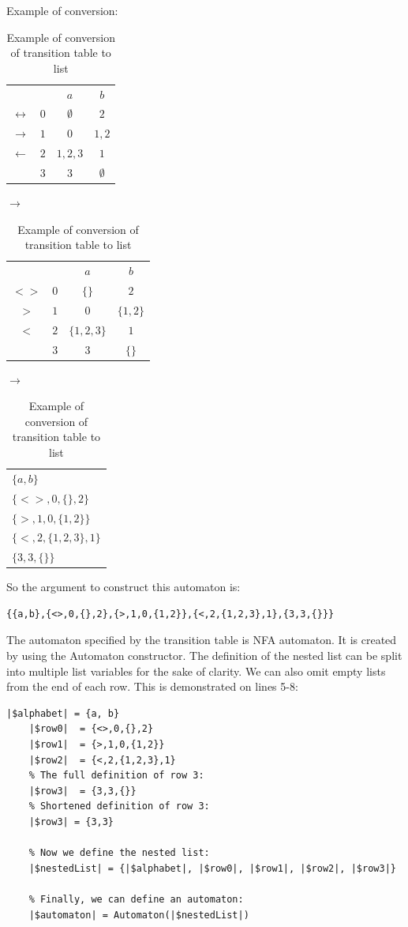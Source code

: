 \documentclass{ctuthesis}
\begin{document}
Example of conversion:
\begin{table}[H]
\begin{ctucolortab}
\begin{tabular}{cc|cc}
	&	& $a$	& $b$ \\\Midrule
$\leftrightarrow$	& $0$	& $\emptyset$	& $2$ \\
$\rightarrow$	& $1$ & $0$ & $1,2$ \\
$\leftarrow$	& $2$ & $1,2,3$ & $1$ \\
				& $3$ & $3$	& $\emptyset$ 
\end{tabular}
\quad
$\rightarrow$
\begin{tabular}{|c|c|c|c|}
\hline
	&&$a$&$b$ \\
	$<>$ & $0$ & $\{\}$ & $2$ \\
	$>$ & $1$ & $0$ & $\{1,2\}$ \\
	$<$ & $2$ & $\{1,2,3\}$ & $1$ \\
		& $3$ & $3$ & $\{\}$\\
		\hline
\end{tabular}
\quad 
$\rightarrow$
\begin{tabular}{|l|}
\hline 
$\{a, b\}$ \\
$\{<>,0,\{\}, 2\}$ \\
$\{>,1,0,\{1,2\}\}$ \\
$\{<,2,\{1,2,3\},1\}$ \\
$\{3, 3, \{\}\}$ \\\hline
\end{tabular}
\end{ctucolortab}
\caption{Example of conversion of transition table to list}
\label{fig:example_conversion}
\end{table}

So the argument to construct this automaton is:
\begin{lstlisting}[language = JASL_snippet]
	{{a,b},{<>,0,{},2},{>,1,0,{1,2}},{<,2,{1,2,3},1},{3,3,{}}}
\end{lstlisting}

The automaton specified by the transition table is NFA automaton. It is created by using the Automaton constructor. The definition of the nested list can be split into multiple list variables for the sake of clarity. We can also omit empty lists from the end of each row. This is demonstrated on lines 5-8:

\begin{minipage}{\linewidth}
\begin{lstlisting}[language = JASL]
	|$alphabet| = {a, b}
	|$row0|  = {<>,0,{},2}
	|$row1|  = {>,1,0,{1,2}}
	|$row2|  = {<,2,{1,2,3},1}
	% The full definition of row 3:
	|$row3|  = {3,3,{}}
	% Shortened definition of row 3:
	|$row3| = {3,3}
	
	% Now we define the nested list:
	|$nestedList| = {|$alphabet|, |$row0|, |$row1|, |$row2|, |$row3|}
    
	% Finally, we can define an automaton:
	|$automaton| = Automaton(|$nestedList|)
\end{lstlisting}
\end{minipage}
\end{document}
